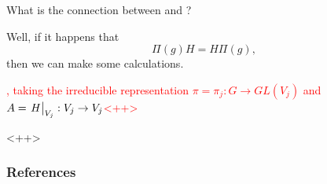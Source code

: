 \documentclass[10pt,aspectratio=169,xcolor={table,dvipsnames}]{beamer}
\begin{document}
\begin{frame}

What is the connection between  and ?

Well, if it happens that
$$
\Pi(g) H = H \Pi(g),
$$
then we can make some calculations.

\textcolor{red}{, taking the irreducible representation $\pi = \pi_j: G \to GL(V_j)$ and $A = \eval{H}_{V_j}: V_j \to V_j$<++>}

\end{frame}
<++>


\begin{frame}
    \frametitle{References}
    
    
\end{frame}
\end{document}
